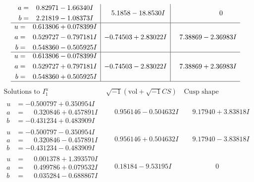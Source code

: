 \documentclass[1p]{elsarticle_modified}
\theoremstyle{definition}
\newcommand{\I}{\sqrt{-1}}
\begin{document}
$$\begin{array}{c|c|c}
\begin{aligned}
a &= \phantom{-}0.82971 - 1.66340 I \\
b &= \phantom{-}2.21819 - 1.08373 I\end{aligned}
 & \phantom{-}5.1858 - 18.8530 I & \phantom{-0.000000 } 0 \\ \hline\begin{aligned}
u &= \phantom{-}0.613806 + 0.078399 I \\
a &= \phantom{-}0.529727 - 0.797181 I \\
b &= \phantom{-}0.548360 - 0.505925 I\end{aligned}
 & -0.74503 + 2.83022 I & \phantom{-}7.38869 - 2.36983 I \\ \hline\begin{aligned}
u &= \phantom{-}0.613806 - 0.078399 I \\
a &= \phantom{-}0.529727 + 0.797181 I \\
b &= \phantom{-}0.548360 + 0.505925 I\end{aligned}
 & -0.74503 - 2.83022 I & \phantom{-}7.38869 + 2.36983 I\\
 \hline 
 \end{array}$$\newpage$$\begin{array}{c|c|c}  
\text{Solutions to }I^u_{1}& \I (\text{vol} + \sqrt{-1}CS) & \text{Cusp shape}\\
 \hline 
\begin{aligned}
u &= -0.500797 + 0.350954 I \\
a &= \phantom{-}0.320846 + 0.457891 I \\
b &= -0.431234 + 0.483909 I\end{aligned}
 & \phantom{-}0.956146 - 0.504632 I & \phantom{-}9.17940 + 3.83818 I \\ \hline\begin{aligned}
u &= -0.500797 - 0.350954 I \\
a &= \phantom{-}0.320846 - 0.457891 I \\
b &= -0.431234 - 0.483909 I\end{aligned}
 & \phantom{-}0.956146 + 0.504632 I & \phantom{-}9.17940 - 3.83818 I \\ \hline\begin{aligned}
u &= \phantom{-}0.001378 + 1.393570 I \\
a &= \phantom{-}0.499786 + 0.079532 I \\
b &= \phantom{-}0.035284 - 0.688867 I\end{aligned}
 & \phantom{-}0.18184 - 9.53195 I & \phantom{-0.000000 } 0 \\ \hline\begin{aligned}

\end{aligned}
\end{array}$$
\end{document}

